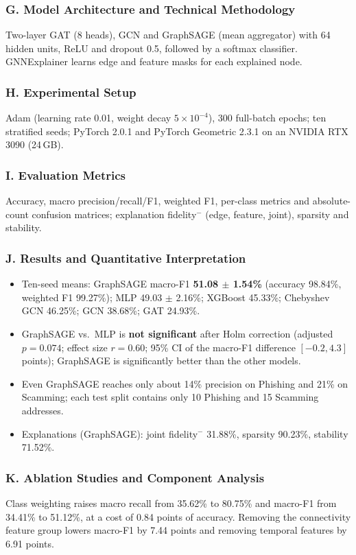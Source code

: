 \documentclass[11pt,a4paper]{article}
\begin{document}
\subsubsection*{G. Model Architecture and Technical Methodology}
Two-layer GAT (8 heads), GCN and GraphSAGE (mean aggregator) with 64 hidden units, ReLU and dropout 0.5, followed by a softmax classifier. GNNExplainer learns edge and feature masks for each explained node.

\subsubsection*{H. Experimental Setup}
Adam (learning rate 0.01, weight decay $5\times10^{-4}$), 300 full-batch epochs; ten stratified seeds; PyTorch 2.0.1 and PyTorch Geometric 2.3.1 on an NVIDIA RTX 3090 (24\,GB).

\subsubsection*{I. Evaluation Metrics}
Accuracy, macro precision/recall/F1, weighted F1, per-class metrics and absolute-count confusion matrices; explanation fidelity$^-$ (edge, feature, joint), sparsity and stability.

\subsubsection*{J. Results and Quantitative Interpretation}
\begin{itemize}[leftmargin=*]
    \item Ten-seed means: GraphSAGE macro-F1 \textbf{51.08 $\pm$ 1.54\%} (accuracy 98.84\%, weighted F1 99.27\%); MLP 49.03 $\pm$ 2.16\%; XGBoost 45.33\%; Chebyshev GCN 46.25\%; GCN 38.68\%; GAT 24.93\%.
    \item GraphSAGE vs.\ MLP is \textbf{not significant} after Holm correction (adjusted $p = 0.074$; effect size $r = 0.60$; 95\% CI of the macro-F1 difference $[-0.2, 4.3]$ points); GraphSAGE is significantly better than the other models.
    \item Even GraphSAGE reaches only about 14\% precision on Phishing and 21\% on Scamming; each test split contains only 10 Phishing and 15 Scamming addresses.
    \item Explanations (GraphSAGE): joint fidelity$^-$ 31.88\%, sparsity 90.23\%, stability 71.52\%.
\end{itemize}

\subsubsection*{K. Ablation Studies and Component Analysis}
Class weighting raises macro recall from 35.62\% to 80.75\% and macro-F1 from 34.41\% to 51.12\%, at a cost of 0.84 points of accuracy. Removing the connectivity feature group lowers macro-F1 by 7.44 points and removing temporal features by 6.91 points.
\end{document}
